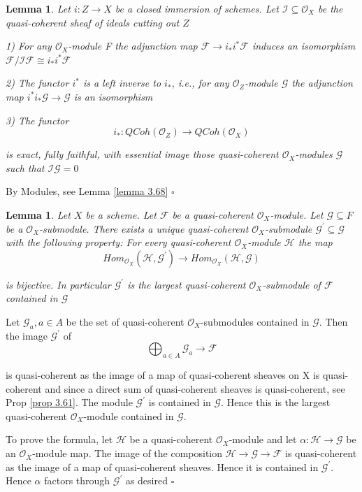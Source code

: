 \documentclass{article}
\newtheorem{lemma}[theorem]{Lemma}
\newenvironment{Proof}{{\noindent \indent \it Proof:\quad}}{\hfill $\square$\par}
\begin{document}
\begin{lemma}
    Let $i:Z\to X$ be a closed immersion of schemes. Let $\mathcal I \subseteq \mathcal O_X$ be the quasi-coherent sheaf of ideals cutting out $Z$

1) For any $\mathcal O_X$-module F the adjunction map $\mathcal F \to i_\ast i^\ast \mathcal F$ induces an isomorphism $\mathcal F/\mathcal I\mathcal F \cong i_\ast i^\ast \mathcal F$

2) The functor $i^\ast$ is a left inverse to $i_\ast$, i.e., for any $\mathcal O_Z$-module $\mathcal G$ the adjunction map $i^\ast i_\ast \mathcal G \to \mathcal G$ is an isomorphism

3) The functor
$$i_\ast:QCoh(\mathcal O_Z) \to QCoh(\mathcal O_X)$$

is exact, fully faithful, with essential image those quasi-coherent $\mathcal O_X$-modules $\mathcal G$ such that  $\mathcal I\mathcal G=0$
\end{lemma}
\begin{Proof}
By Modules, see Lemma \ref{lemma 3.68}
\end{Proof}

\begin{lemma}
    Let $X$ be a scheme. Let $\mathcal F$ be a quasi-coherent $\mathcal O_X$-module. Let $\mathcal G \subseteq F$ be a $\mathcal O_X$-submodule. There exists a unique quasi-coherent $\mathcal O_X$-submodule $\mathcal G^\prime \subseteq \mathcal G$ with the following property: For every quasi-coherent $\mathcal O_X$-module $\mathcal H$ the map
$$
Hom_{\mathcal O_X}(\mathcal H, \mathcal G^\prime) \to Hom_{\mathcal O_X}(\mathcal H,\mathcal G)
$$ 

is bijective. In particular $\mathcal G^\prime$ is the largest quasi-coherent $\mathcal O_X$-submodule of $\mathcal F$ contained in $\mathcal G$
\label{lemma 3.72}
\end{lemma}
\begin{Proof}
    Let $\mathcal G_a, a\in A$ be the set of quasi-coherent $\mathcal O_X$-submodules contained in $\mathcal G$. Then the image $\mathcal G^\prime$ of
    $$
    \bigoplus_{a \in A}\mathcal G_a \to \mathcal F
    $$

    is quasi-coherent as the image of a map of quasi-coherent sheaves on X is quasi-coherent and since a direct sum of quasi-coherent sheaves is quasi-coherent, see Prop \ref{prop 3.61}. The module $\mathcal G^\prime$ is contained in $\mathcal G$. Hence this is the largest quasi-coherent $\mathcal O_X$-module contained in $\mathcal G$.

    To prove the formula, let $\mathcal H$ be a quasi-coherent $\mathcal O_X$-module and let $\alpha:\mathcal H\to \mathcal G$ be an $\mathcal O_X$-module map. The image of the composition $\mathcal H \to \mathcal G \to \mathcal F$ is quasi-coherent as the image of a map of quasi-coherent sheaves. Hence it is contained in $\mathcal G^\prime$. Hence $\alpha$ factors through $\mathcal G^\prime$ as desired
\end{Proof}
\end{document}

